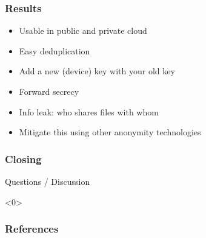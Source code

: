 \documentclass{beamer}
\begin{document}
\begin{frame}
    \frametitle{Results}
    \begin{itemize}
    \item Usable in public and private cloud
    \item Easy deduplication
    \item Add a new (device) key with your old key
    \item Forward secrecy
    \item Info leak: who shares files with whom
    \item Mitigate this using other anonymity technologies
    \end{itemize}
\end{frame}

\begin{frame}
    \frametitle{Closing}
    Questions / Discussion
\end{frame}

\begin{frame}<0>
    \frametitle{References}
    
    
\end{frame}
\end{document}

